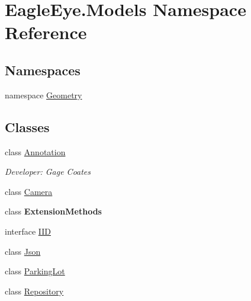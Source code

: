 \hypertarget{namespace_eagle_eye_1_1_models}{}\section{Eagle\+Eye.\+Models Namespace Reference}
\label{namespace_eagle_eye_1_1_models}
\subsection*{Namespaces}
\begin{DoxyCompactItemize}
\item 
namespace \mbox{\hyperlink{namespace_eagle_eye_1_1_models_1_1_geometry}{Geometry}}
\end{DoxyCompactItemize}
\subsection*{Classes}
\begin{DoxyCompactItemize}
\item 
class \mbox{\hyperlink{class_eagle_eye_1_1_models_1_1_annotation}{Annotation}}
\begin{DoxyCompactList}\small\item\em Developer\+: Gage Coates \end{DoxyCompactList}\item 
class \mbox{\hyperlink{class_eagle_eye_1_1_models_1_1_camera}{Camera}}
\item 
class {\bfseries Extension\+Methods}
\item 
interface \mbox{\hyperlink{interface_eagle_eye_1_1_models_1_1_i_i_d}{I\+ID}}
\item 
class \mbox{\hyperlink{class_eagle_eye_1_1_models_1_1_json}{Json}}
\item 
class \mbox{\hyperlink{class_eagle_eye_1_1_models_1_1_parking_lot}{Parking\+Lot}}
\item 
class \mbox{\hyperlink{class_eagle_eye_1_1_models_1_1_repository}{Repository}}
\end{DoxyCompactItemize}
